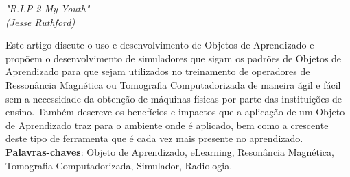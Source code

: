 \documentclass[12pt,openright,oneside,a4paper,english,french,spanish,brazil]{unifil}
\begin{document}

\begin{epigrafe}
\vspace*{\fill}
\begin{flushright}
\textit{"R.I.P 2 My Youth" \\
(Jesse Ruthford)}
\end{flushright}
\end{epigrafe}

\par
\begin{resumo}

Este artigo discute o uso e desenvolvimento de Objetos de Aprendizado e propõem o desenvolvimento de simuladores que sigam os padrões de Objetos de Aprendizado para que sejam utilizados no treinamento de operadores de Ressonância Magnética ou Tomografia Computadorizada de maneira ágil e fácil sem a necessidade da obtenção de máquinas físicas por parte das instituições de ensino. Também descreve os benefícios e impactos que a aplicação de um Objeto de Aprendizado traz para o ambiente onde é aplicado, bem como a crescente deste tipo de ferramenta que é cada vez mais presente no aprendizado.
\vspace{\onelineskip} \\
\noindent
\textbf{Palavras-chaves}: Objeto de Aprendizado, eLearning, Resonância Magnética, Tomografia Computadorizada, Simulador, Radiologia.
\end{resumo}
\end{document}
